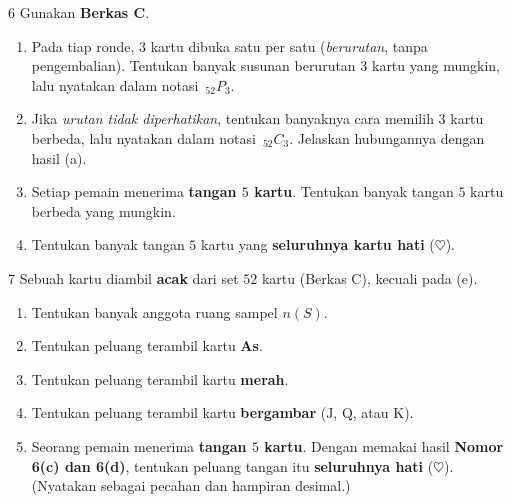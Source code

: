 \documentclass[11pt]{article}
\newenvironment{subsoal}{%
  \begin{enumerate}[label=\textbf{(\alph*)},leftmargin=1.8em,itemsep=5pt,topsep=3pt]}%
  {\end{enumerate}}
\begin{document}
\begin{soal}{6}
Gunakan \textbf{Berkas C}.
\begin{subsoal}
  \item Pada tiap ronde, $3$ kartu dibuka satu per satu (\emph{berurutan}, tanpa
        pengembalian). Tentukan banyak susunan berurutan $3$ kartu yang mungkin,
        lalu nyatakan dalam notasi $\,_{52}P_{3}$.
  \item Jika \emph{urutan tidak diperhatikan}, tentukan banyaknya cara memilih $3$
        kartu berbeda, lalu nyatakan dalam notasi $\,_{52}C_{3}$. Jelaskan
        hubungannya dengan hasil (a).
  \item Setiap pemain menerima \textbf{tangan $5$ kartu}. Tentukan banyak tangan
        $5$ kartu berbeda yang mungkin.
  \item Tentukan banyak tangan $5$ kartu yang \textbf{seluruhnya kartu hati}
        ($\heartsuit$).
\end{subsoal}
\end{soal}

\begin{soal}{7}
Sebuah kartu diambil \textbf{acak} dari set $52$ kartu (Berkas C), kecuali pada (e).
\begin{subsoal}
  \item Tentukan banyak anggota ruang sampel $n(S)$.
  \item Tentukan peluang terambil kartu \textbf{As}.
  \item Tentukan peluang terambil kartu \textbf{merah}.
  \item Tentukan peluang terambil kartu \textbf{bergambar} ($\mathrm{J}$,
        $\mathrm{Q}$, atau $\mathrm{K}$).
  \item Seorang pemain menerima \textbf{tangan $5$ kartu}. Dengan memakai hasil
        \textbf{Nomor 6(c) dan 6(d)}, tentukan peluang tangan itu \textbf{seluruhnya
        hati} ($\heartsuit$). (Nyatakan sebagai pecahan dan hampiran desimal.)
\end{subsoal}
\end{soal}
\end{document}
